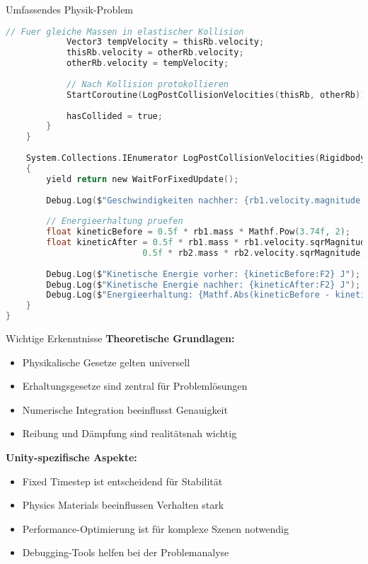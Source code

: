 \begin{example2}{Umfassendes Physik-Problem}
\begin{lstlisting}[language=C, style=basesmol]
            // Fuer gleiche Massen in elastischer Kollision
            Vector3 tempVelocity = thisRb.velocity;
            thisRb.velocity = otherRb.velocity;
            otherRb.velocity = tempVelocity;
            
            // Nach Kollision protokollieren
            StartCoroutine(LogPostCollisionVelocities(thisRb, otherRb));
            
            hasCollided = true;
        }
    }
    
    System.Collections.IEnumerator LogPostCollisionVelocities(Rigidbody rb1, Rigidbody rb2) 
    {
        yield return new WaitForFixedUpdate();
        
        Debug.Log($"Geschwindigkeiten nachher: {rb1.velocity.magnitude:F2}, {rb2.velocity.magnitude:F2}");
        
        // Energieerhaltung pruefen
        float kineticBefore = 0.5f * rb1.mass * Mathf.Pow(3.74f, 2);
        float kineticAfter = 0.5f * rb1.mass * rb1.velocity.sqrMagnitude + 
                           0.5f * rb2.mass * rb2.velocity.sqrMagnitude;
        
        Debug.Log($"Kinetische Energie vorher: {kineticBefore:F2} J");
        Debug.Log($"Kinetische Energie nachher: {kineticAfter:F2} J");
        Debug.Log($"Energieerhaltung: {Mathf.Abs(kineticBefore - kineticAfter) < 0.1f}");
    }
}
\end{lstlisting}
\end{example2}

\begin{concept}{Wichtige Erkenntnisse}
    \textbf{Theoretische Grundlagen:}
    \begin{itemize}
        \item Physikalische Gesetze gelten universell
        \item Erhaltungsgesetze sind zentral für Problemlösungen
        \item Numerische Integration beeinflusst Genauigkeit
        \item Reibung und Dämpfung sind realitätsnah wichtig
    \end{itemize}
    
    \textbf{Unity-spezifische Aspekte:}
    \begin{itemize}
        \item Fixed Timestep ist entscheidend für Stabilität
        \item Physics Materials beeinflussen Verhalten stark
        \item Performance-Optimierung ist für komplexe Szenen notwendig
        \item Debugging-Tools helfen bei der Problemanalyse
    \end{itemize}
\end{concept}